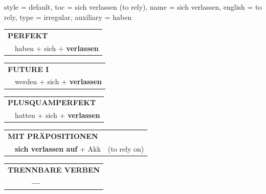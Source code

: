 \begin{verbentry}{
  style = {default},
  toc = {sich verlassen (to rely)},
  name = {sich verlassen},
  english = {to rely},
  type = {irregular},
  auxiliary = {haben}
}
    \vspace{10pt}

 \begin{tabular}{rl}
     \multicolumn{2}{l}{\textbf{PERFEKT}}\\
   & haben + sich + \textbf{verlassen}\\
  \end{tabular}
\hfill
   \begin{tabular}{rl}
    \multicolumn{2}{l}{\textbf{FUTURE I} }\\
   & werden + sich + \textbf{verlassen}\\
  \end{tabular}
\hfill
   \begin{tabular}{rl}
      \multicolumn{2}{l}{\textbf{PLUSQUAMPERFEKT}}\\
   & hatten + sich + \textbf{verlassen}\\
  \end{tabular}

   \vspace{10pt}

   \begin{tabular}{lll}
      \multicolumn{3}{l}{\textbf{MIT PRÄPOSITIONEN}}\\
& \textbf{sich verlassen auf} + Akk & (to rely on)\\
\end{tabular}
  \hfill
   \begin{tabular}{lll}
\multicolumn{3}{l}{\textbf{TRENNBARE VERBEN}}\\
& \textbf{---} & \\
\end{tabular}

  \vspace{-5pt}
\end{verbentry}

